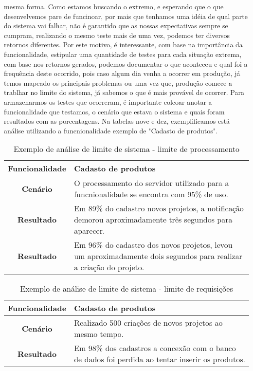       mesma forma. Como estamos buscando o extremo, e esperando que o que desenvelvemos
      pare de funcinoar, por mais que tenhamos uma idéia de qual parte do sistema
      vai falhar, não é garantido que as nossas expectativas sempre se cumpram,
      realizando o mesmo teste mais de uma vez, podemos ter diversos retornos
      diferentes. Por este motivo, é interessante, com base na importância da
      funcionalidade, estipular uma quantidade de testes para cada situação extrema,
      com base nos retornos gerados, podemos documentar o que aconteceu e qual foi
      a frequência deste ocorrido, pois caso algum dia venha a ocorrer em produção,
      já temos mapeado os principais problemas ou uma vez que, produção comece a
      trablhar no limite do sistema, já sabemos o que é mais provável de ocorrer.
      Para armazenarmos os testes que ocorreram, é importante colcoar anotar a
      funcionalidade que testamos, o cenário que estava o sistema e quais foram
      resultados com as porcentagens. Na tabelas nove e dez, exemplificamos está análise
      utilizando a funcnionalidade exemplo de "Cadasto de produtos". \newline

      \begin{table}[h!]
        \centering
        \begin{tabular}{|c|p{10cm}|}
          \hline
          \textbf{Funcionalidade} &
          Cadasto de produtos \\ \hline
          \textbf{Cenário} &
          O processamento do servidor utilizado para a funcnionalidade se encontra
          com 95\% de uso. \\ \hline
          \textbf{Resultado} &
          Em 89\% do cadastro novos projetos, a notificação demorou aproximadamente
          três segundos para aparecer. \\ \hline
          \textbf{Resultado} &
          Em 96\% do cadastro dos novos projetos, levou um aproximadamente dois
          segundos para realizar a criação do projeto. \\ \hline
        \end{tabular}
        \caption{Exemplo de análise de limite de sistema - limite de processamento}
        \label{Tabela:9}
      \end{table}

      \begin{table}[h!]
        \centering
        \begin{tabular}{|c|p{10cm}|}
          \hline
          \textbf{Funcionalidade} &
          Cadasto de produtos \\ \hline
          \textbf{Cenário} &
          Realizado 500 criações de novos projetos ao mesmo tempo. \\ \hline
          \textbf{Resultado} &
          Em 98\% dos cadastros a concexão com o banco de dados foi perdida ao tentar
          inserir os produtos. \\ \hline
        \end{tabular}
        \caption{Exemplo de análise de limite de sistema - limite de requisições}
        \label{Tabela:10}
      \end{table}

